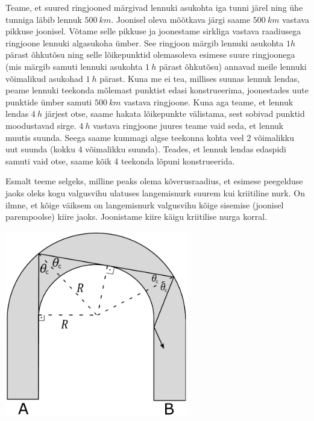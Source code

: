 \documentclass[10pt]{article}
\begin{document}
Teame, et suured ringjooned märgivad lennuki asukohta iga tunni järel ning ühe tunniga läbib lennuk $\SI{500}{km}$. Joonisel oleva mõõtkava järgi saame $\SI{500}{km}$ vastava pikkuse joonisel. Võtame selle pikkuse ja joonestame sirkliga vastava raadiusega ringjoone lennuki algasukoha ümber. See ringjoon märgib lennuki asukohta $1h$ pärast õhkutõsu ning selle lõikepunktid olemasoleva esimese suure ringjoonega (mis märgib samuti lennuki asukohta $\SI{1}{h}$ pärast õhkutõsu) annavad meile lennuki võimalikud asukohad $\SI{1}{h}$ pärast. Kuna me ei tea, millises suunas lennuk lendas, peame lennuki teekonda mõlemast punktist edasi konstrueerima, joonestades uute punktide ümber samuti $\SI{500}{km}$ vastava ringjoone. Kuna aga teame, et lennuk lendas $\SI{4}{h}$ järjest otse, saame hakata lõikepunkte välistama, sest sobivad punktid moodustavad sirge. $\SI{4}{h}$ vastava ringjoone juures teame vaid seda, et lennuk muutis suunda. Seega saame kummagi algse teekonna kohta veel 2 võimalikku uut suunda (kokku 4 võimalikku suunda). Teades, et lennuk lendas edaspidi samuti vaid otse, saame kõik 4 teekonda lõpuni konstrueerida.
\probend
\bigskip


\solu
Esmalt teeme selgeks, milline peaks olema kõverusraadius, et esimese peegelduse jaoks oleks kogu valgusvihu ulatuses langemisnurk suurem kui kriitiline nurk. On ilmne, et kõige väiksem on langemisnurk valgusvihu kõige sisemise (joonisel parempoolse) kiire jaoks. Joonistame kiire käigu kriitilise nurga korral.

\begin{center}
	\includegraphics[width=0.6\textwidth]{2020-lahg-03-yl.pdf} 
\end{center}
\end{document}
